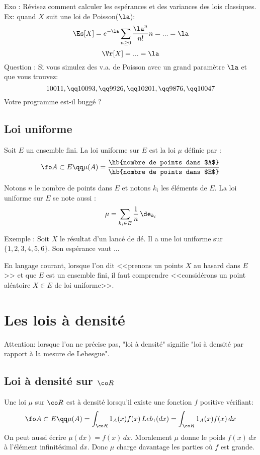 \documentclass{article}
\begin{document}
 
Exo : Révisez  comment calculer les espérances et des variances  des lois classiques. Ex: quand $X$ suit une loi de Poisson($\la$): 
$$
\Es[X] = e^{-\la }\sum_{n\geq 0}   \frac {\la^n}{n!}   n = ... = \la
$$
 $$
 \Vr[X] =  ...= \la
 $$ 
Question : Si vous simulez des v.a. de Poisson avec un grand paramètre $\la$ et que vous trouvez:
$$
10011, \qq 10093, \qq  9 926,  \qq 10 201, \qq  9 876, \qq  10047  
$$ 
Votre programme est-il buggé ? 


\subsection{ Loi uniforme}


Soit $E$ un ensemble fini. La loi uniforme sur $E$ est la loi $\mu$ définie par : 
$$
\fo A\subset E \qq \mu(A) =  \frac {\hb{nombre de points dans $A$}}{\hb{nombre de points dans $E$}}
$$

Notons $n$ le nombre de points dans $E$ et notons $k_i$ les éléments de $E$.  La loi uniforme sur $E$ se note aussi : 
$$
\mu =  \sum_{k_i \in E}  \frac 1 n  \,  \de_{k_i} 
$$

Exemple : Soit $X$ le résultat d'un lancé de dé. Il a une loi uniforme sur $\{1,2,3,4,5,6\}$. Son espérance vaut ... 

En langage courant, lorsque l'on dit <<prenons un points $X$ au hasard dans $E$>>   et que $E$ est un ensemble fini, il faut comprendre  <<considérons un point aléatoire $X\in E$ de loi uniforme>>. 



\section{Les lois à densité}

Attention: lorsque l'on ne précise pas, "loi à densité" signifie "loi à densité par rapport à la mesure de Lebesgue". 


\subsection{Loi à densité sur $\co R$}


Une loi $\mu$ sur $ \co R $ est à densité lorsqu'il existe une fonction $f$  positive vérifiant:
$$
\fo A \subset E \qq \mu(A) = \int_{\co R}  1_A(x)     f(x) \, Leb_1(dx)= \int_{\co R}  1_A(x)     f(x) \, dx
$$
On peut aussi écrire $\mu(dx) =  f(x)\, dx$. Moralement $\mu$ donne  le poids $f(x)\, dx$ à l'élément infinitésimal $dx$.   Donc $\mu$ charge davantage les parties où $f$ est grande.
\end{document}

